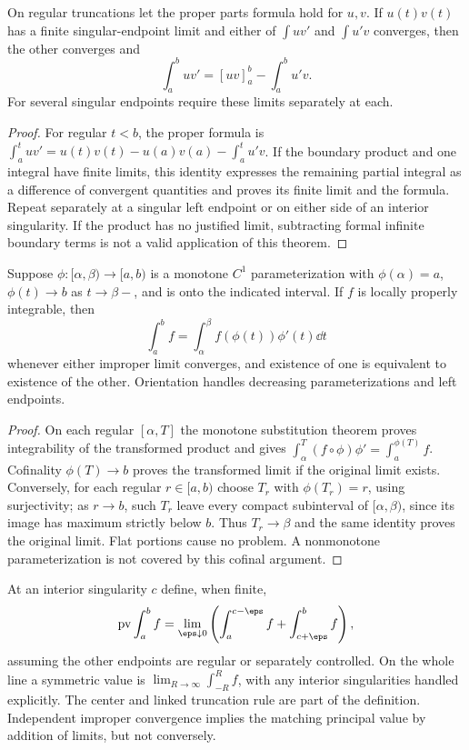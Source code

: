 \begin{theorem}
On regular truncations let the proper parts formula hold for $u,v$.
If $u(t)v(t)$ has a finite singular-endpoint limit and either of
$\int uv'$ and $\int u'v$ converges, then the other converges and
\[\int_a^buv'=[uv]_a^b-\int_a^bu'v.
\]
For several singular endpoints require these limits separately at each.
\end{theorem}
\begin{proof}
For regular $t<b$, the proper formula is
$\int_a^tuv'=u(t)v(t)-u(a)v(a)-\int_a^tu'v$.
If the boundary product and one integral have finite limits, this
identity expresses the remaining partial integral as a difference of
convergent quantities and proves its finite limit and the formula.
Repeat separately at a singular left endpoint or on either side of an
interior singularity. If the product has no justified limit, subtracting
formal infinite boundary terms is not a valid application of this theorem.
\end{proof}

\begin{theorem}
Suppose $\phi:[\alpha,\beta)\to[a,b)$ is a monotone $C^1$
parameterization with $\phi(\alpha)=a$, $\phi(t)\to b$ as
$t\to\beta-$, and is onto the indicated interval. If $f$ is locally
properly integrable, then
\[\int_a^bf=\int_\alpha^\beta f(\phi(t))\phi'(t)\dd t
\]
whenever either improper limit converges, and existence of one is
equivalent to existence of the other. Orientation handles decreasing
parameterizations and left endpoints.
\end{theorem}
\begin{proof}
On each regular $[\alpha,T]$ the monotone substitution theorem proves
integrability of the transformed product and gives
$\int_\alpha^T(f\circ\phi)\phi'=\int_a^{\phi(T)}f$.
Cofinality $\phi(T)\to b$ proves the transformed limit if the original
limit exists. Conversely, for each regular $r\in[a,b)$ choose
$T_r$ with $\phi(T_r)=r$, using surjectivity; as $r\to b$, such
$T_r$ leave every compact subinterval of $[\alpha,\beta)$, since its
image has maximum strictly below $b$. Thus $T_r\to\beta$ and the
same identity proves the original limit. Flat portions cause no problem.
A nonmonotone parameterization is not covered by this cofinal argument.
\end{proof}

\begin{definition}
At an interior singularity $c$ define, when finite,
\[\operatorname{pv}\int_a^bf
=\lim_{\eps\downarrow0}\left(\int_a^{c-\eps}f+
\int_{c+\eps}^bf\right),
\]
assuming the other endpoints are regular or separately controlled.
On the whole line a symmetric value is
$\lim_{R\to\infty}\int_{-R}^Rf$, with any interior singularities
handled explicitly. The center and linked truncation rule are part of
the definition. Independent improper convergence implies the matching
principal value by addition of limits, but not conversely.
\end{definition}

